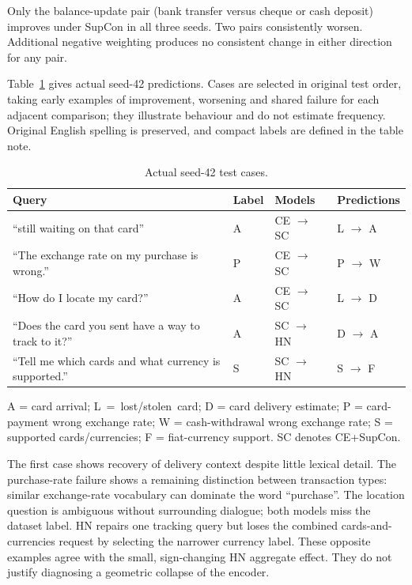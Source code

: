 \documentclass[runningheads]{llncs}
\begin{document}
Only the balance-update pair (bank transfer versus cheque or cash deposit) improves under SupCon in all three seeds. Two pairs consistently worsen. Additional negative weighting produces no consistent change in either direction for any pair.

Table~\ref{tab:cases} gives actual seed-42 predictions. Cases are selected in original test order, taking early examples of improvement, worsening and shared failure for each adjacent comparison; they illustrate behaviour and do not estimate frequency. Original English spelling is preserved, and compact labels are defined in the table note.

\begin{table}[tb]
\caption{Actual seed-42 test cases.}
\label{tab:cases}\centering\small
\begin{tabular}{@{}l@{\enspace}l@{\enspace}l@{\enspace}l@{}}\toprule
Query & Label & Models & Predictions\\\midrule
``still waiting on that card'' & A & CE $\to$ SC & L $\to$ A\\\addlinespace[3pt]
``The exchange rate on my purchase is wrong.'' & P & CE $\to$ SC & P $\to$ W\\\addlinespace[3pt]
``How do I locate my card?'' & A & CE $\to$ SC & L $\to$ D\\\addlinespace[3pt]
``Does the card you sent have a way to track to it?'' & A & SC $\to$ HN & D $\to$ A\\\addlinespace[3pt]
``Tell me which cards and what currency is supported.'' & S & SC $\to$ HN & S $\to$ F\\\bottomrule
\end{tabular}
\par\smallskip\noindent\parbox{\linewidth}{\small A = card arrival; L~=~lost/stolen~card; D = card delivery estimate; P = card-payment wrong exchange rate; W = cash-withdrawal wrong exchange rate; S = supported cards/currencies; F = fiat-currency support. SC denotes CE+SupCon.}
\end{table}

The first case shows recovery of delivery context despite little lexical detail. The purchase-rate failure shows a remaining distinction between transaction types: similar exchange-rate vocabulary can dominate the word ``purchase''. The location question is ambiguous without surrounding dialogue; both models miss the dataset label. HN repairs one tracking query but loses the combined cards-and-currencies request by selecting the narrower currency label. These opposite examples agree with the small, sign-changing HN aggregate effect. They do not justify diagnosing a geometric collapse of the encoder.
\end{document}

